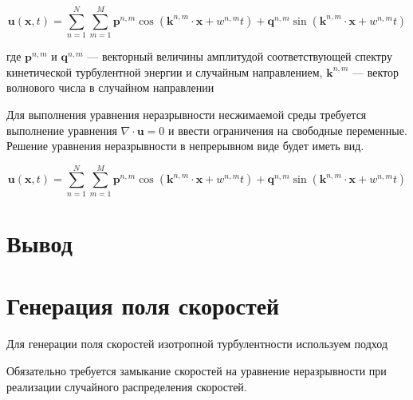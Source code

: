 \documentclass[12pt,a4paper]{article}
\begin{document}
\begin{equation} \label{eq_u_initial}
\boldsymbol{u}(\boldsymbol{x},t) = 
\sum_{n=1}^N \sum_{m=1}^M \boldsymbol{p}^{n,m} 
\cos{\left( \boldsymbol{k}^{n,m} \cdot \boldsymbol{x} + w^{n,m} t \right)} + 
\boldsymbol{q}^{n,m} \sin{\left( \boldsymbol{k}^{n,m} 
	\cdot \boldsymbol{x} + w^{n,m} t \right)}
\end{equation}

где $\boldsymbol{p}^{n,m}$ и $\boldsymbol{q}^{n,m}$ --- векторный величины амплитудой соответствующей спектру кинетической турбулентной энергии и случайным направлением, $\boldsymbol{k}^{n,m}$ --- вектор волнового числа в случайном направлении 

Для выполнения уравнения неразрывности несжимаемой среды требуется выполнение уравнения $\nabla \cdot \boldsymbol{u} = 0$ и ввести ограничения на свободные переменные. Решение уравнения неразрывности в непрерывном виде будет иметь вид.

\begin{equation} \label{eq_u_initial}
\boldsymbol{u}(\boldsymbol{x},t) = 
\sum_{n=1}^N \sum_{m=1}^M \boldsymbol{p}^{n,m} 
\cos{\left( \boldsymbol{k}^{n,m} \cdot \boldsymbol{x} + w^{n,m} t \right)} + 
\boldsymbol{q}^{n,m} \sin{\left( \boldsymbol{k}^{n,m} 
	\cdot \boldsymbol{x} + w^{n,m} t \right)}
\end{equation}

\section*{Вывод}

\section{Генерация поля скоростей}

Для генерации поля скоростей изотропной турбулентности используем подход 


Обязательно требуется замыкание скоростей на уравнение неразрывности при реализации случайного распределения скоростей.
\end{document}
